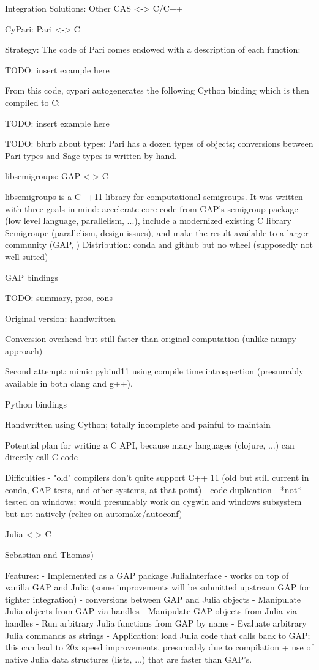  Integration Solutions: Other CAS <-> C/C++

 CyPari: Pari <-> C

Strategy: The code of Pari comes endowed with a description of each function:

TODO: insert example here

From this code, cypari autogenerates the following Cython binding which is then compiled to C:

TODO: insert example here

TODO: blurb about types: Pari has a dozen types of objects; conversions between Pari types and Sage types is written by hand.

 libsemigroups: GAP <-> C

libsemigroups is a C++11 library for computational semigroups. It was written with three goals in mind: accelerate core code from GAP's semigroup package (low level language, parallelism, ...), include a modernized existing C library Semigroupe (parallelism, design issues), and make the result available to a larger community (GAP, )
Distribution: conda and github but no wheel (supposedly not well suited)
    
 GAP bindings

TODO: summary, pros, cons

Original version: handwritten
    
Conversion overhead but still faster than original computation (unlike numpy approach)

Second attempt: mimic pybind11 using compile time introspection (presumably available in both clang and g++).

 Python bindings

Handwritten using Cython; totally incomplete and painful to maintain

Potential plan for writing a C API, because many languages (clojure, ...) can directly call C code 

 Difficulties
- "old" compilers don't quite support C++ 11 (old but still current in conda, GAP tests, and other systems, at that point)
- code duplication
- *not* tested on windows; would presumably work on cygwin and windows subsystem but not natively (relies on automake/autoconf)

 Julia <-> C

Sebastian and Thomas)

Features:
- Implemented as a GAP package JuliaInterface
- works on top of vanilla GAP and Julia (some improvements will be submitted upstream GAP for tighter integration)
- conversions between GAP and Julia objects
- Manipulate Julia objects from GAP via handles
- Manipulate GAP objects from Julia via handles
- Run arbitrary Julia functions from GAP by name
- Evaluate arbitrary Julia commands as strings
- Application: load Julia code that calls back to GAP; this can lead to 20x speed improvements,
  presumably due to compilation + use of native Julia data structures (lists, ...) that are faster
  than GAP's.

